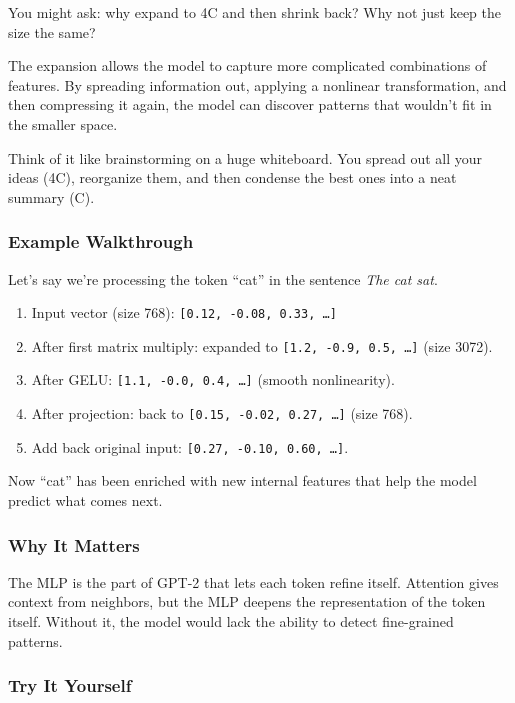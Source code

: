 \documentclass[
  letterpaper,
  DIV=11,
  numbers=noendperiod]{scrreprt}
\providecommand{\tightlist}{%
  \setlength{\itemsep}{0pt}\setlength{\parskip}{0pt}}
\begin{document}
You might ask: why expand to 4C and then shrink back? Why not just keep
the size the same?

The expansion allows the model to capture more complicated combinations
of features. By spreading information out, applying a nonlinear
transformation, and then compressing it again, the model can discover
patterns that wouldn't fit in the smaller space.

Think of it like brainstorming on a huge whiteboard. You spread out all
your ideas (4C), reorganize them, and then condense the best ones into a
neat summary (C).

\subsubsection{Example Walkthrough}\label{example-walkthrough}

Let's say we're processing the token ``cat'' in the sentence \emph{The
cat sat}.

\begin{enumerate}
\def\labelenumi{\arabic{enumi}.}
\tightlist
\item
  Input vector (size 768): \texttt{{[}0.12,\ -0.08,\ 0.33,\ …{]}}
\item
  After first matrix multiply: expanded to
  \texttt{{[}1.2,\ -0.9,\ 0.5,\ …{]}} (size 3072).
\item
  After GELU: \texttt{{[}1.1,\ -0.0,\ 0.4,\ …{]}} (smooth nonlinearity).
\item
  After projection: back to \texttt{{[}0.15,\ -0.02,\ 0.27,\ …{]}} (size
  768).
\item
  Add back original input: \texttt{{[}0.27,\ -0.10,\ 0.60,\ …{]}}.
\end{enumerate}

Now ``cat'' has been enriched with new internal features that help the
model predict what comes next.

\subsubsection{Why It Matters}\label{why-it-matters-21}

The MLP is the part of GPT-2 that lets each token refine itself.
Attention gives context from neighbors, but the MLP deepens the
representation of the token itself. Without it, the model would lack the
ability to detect fine-grained patterns.

\subsubsection{Try It Yourself}\label{try-it-yourself-23}
\end{document}
